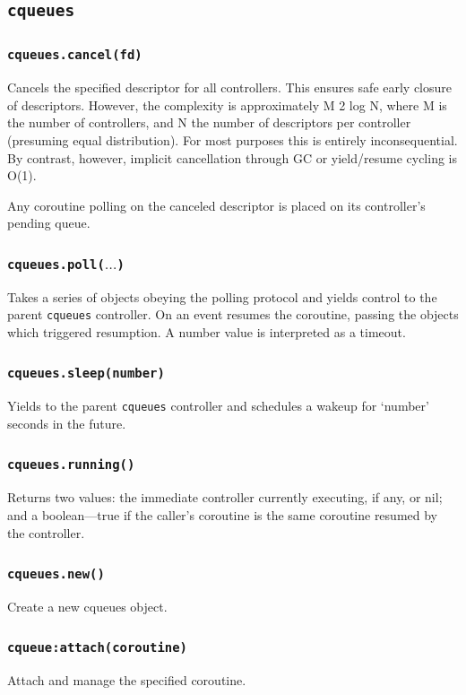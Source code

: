 \documentclass[11pt, oneside]{memoir}
\newcommand*{\cqueues}[0]{\texttt{cqueues}\xspace}
\newcommand*{\routine}[1]{\texttt{#1}\xspace}
\newcounter{toccols}
\newenvironment{Module}[1]{
	\subsection{\texttt{#1}}
	\addtocontents{toc}{
		\protect\begin{multicols}{\value{toccols}}
	}
}{
	\addtocontents{toc}{\protect\end{multicols}}
}
\begin{document}
\begin{Module}{\cqueues}
\subsubsection[\routine{cqueues.cancel}]{\routine{cqueues.cancel(fd)}}
Cancels the specified descriptor for all controllers. This ensures safe early closure of descriptors. However, the complexity is approximately M 2 log N, where M is the number of controllers, and N the number of descriptors per controller (presuming equal distribution). For most purposes this is entirely inconsequential. By contrast, however, implicit cancellation through GC or yield/resume cycling is O(1).

Any coroutine polling on the canceled descriptor is placed on its controller's pending queue.

\subsubsection[\routine{cqueues.poll}]{\routine{cqueues.poll($\ldots$)}}
Takes a series of objects obeying the polling protocol and yields control to the parent \cqueues controller. On an event resumes the coroutine, passing the objects which triggered resumption. A number value is interpreted as a timeout.

\subsubsection[\routine{cqueues.sleep}]{\routine{cqueues.sleep(number)}}

Yields to the parent \cqueues controller and schedules a wakeup for `number' seconds in the future.

\subsubsection[\routine{cqueues.running}]{\routine{cqueues.running()}}

Returns two values: the immediate controller currently executing, if any, or nil; and a boolean---true if the caller's coroutine is the same coroutine resumed by the controller.

\subsubsection[\routine{cqueues.new}]{\routine{cqueues.new()}}
Create a new cqueues object.

\subsubsection[\routine{cqueues:attach}]{\routine{cqueue:attach(coroutine)}}
Attach and manage the specified coroutine.


\end{Module}
\end{document}

